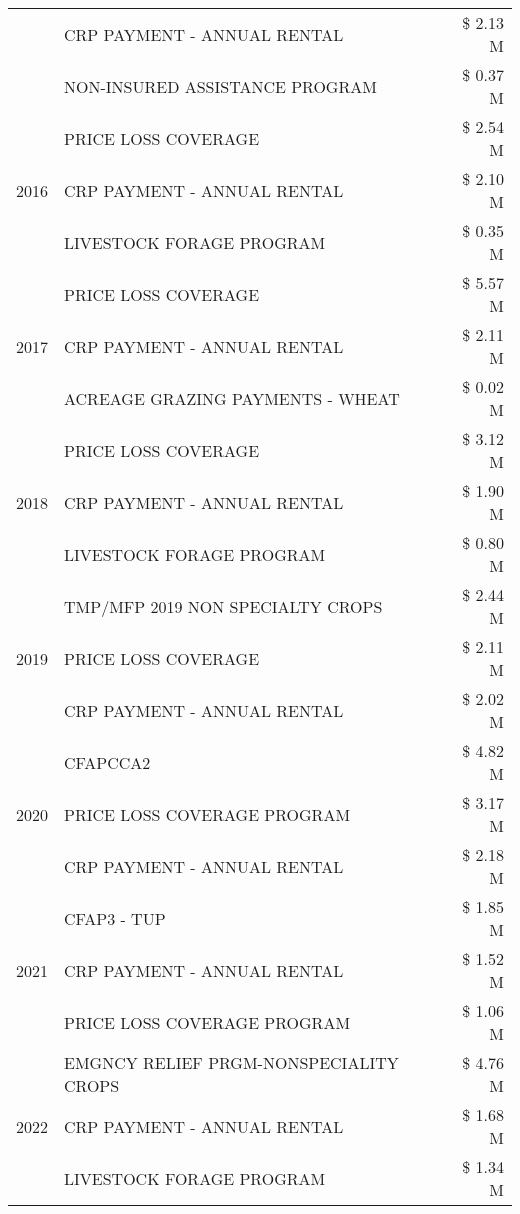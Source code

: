 \begin{tabular}{llr}
 & CRP PAYMENT - ANNUAL RENTAL & \$ 2.13 M \\
 & NON-INSURED ASSISTANCE PROGRAM & \$ 0.37 M \\
\cline{1-3}
\multirow[t]{3}{*}{2016} & PRICE LOSS COVERAGE & \$ 2.54 M \\
 & CRP PAYMENT - ANNUAL RENTAL & \$ 2.10 M \\
 & LIVESTOCK FORAGE PROGRAM & \$ 0.35 M \\
\cline{1-3}
\multirow[t]{3}{*}{2017} & PRICE LOSS COVERAGE & \$ 5.57 M \\
 & CRP PAYMENT - ANNUAL RENTAL & \$ 2.11 M \\
 & ACREAGE GRAZING PAYMENTS - WHEAT & \$ 0.02 M \\
\cline{1-3}
\multirow[t]{3}{*}{2018} & PRICE LOSS COVERAGE & \$ 3.12 M \\
 & CRP PAYMENT - ANNUAL RENTAL & \$ 1.90 M \\
 & LIVESTOCK FORAGE PROGRAM & \$ 0.80 M \\
\cline{1-3}
\multirow[t]{3}{*}{2019} & TMP/MFP 2019 NON SPECIALTY CROPS & \$ 2.44 M \\
 & PRICE LOSS COVERAGE & \$ 2.11 M \\
 & CRP PAYMENT - ANNUAL RENTAL & \$ 2.02 M \\
\cline{1-3}
\multirow[t]{3}{*}{2020} & CFAPCCA2 & \$ 4.82 M \\
 & PRICE LOSS COVERAGE PROGRAM & \$ 3.17 M \\
 & CRP PAYMENT - ANNUAL RENTAL & \$ 2.18 M \\
\cline{1-3}
\multirow[t]{3}{*}{2021} & CFAP3 - TUP & \$ 1.85 M \\
 & CRP PAYMENT - ANNUAL RENTAL & \$ 1.52 M \\
 & PRICE LOSS COVERAGE PROGRAM & \$ 1.06 M \\
\cline{1-3}
\multirow[t]{3}{*}{2022} & EMGNCY RELIEF PRGM-NONSPECIALITY CROPS & \$ 4.76 M \\
 & CRP PAYMENT - ANNUAL RENTAL & \$ 1.68 M \\
 & LIVESTOCK FORAGE PROGRAM & \$ 1.34 M \\
\cline{1-3}
\bottomrule
\end{tabular}
